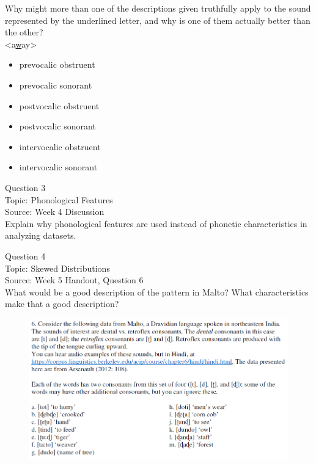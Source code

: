 \documentclass[12pt]{article}
\begin{document}
Why might more than one of the descriptions given truthfully apply to the sound represented by the underlined letter, and why is one of them actually better than the other?\\

<a\underline{w}ay>

\begin{itemize} \item prevocalic obstruent \item prevocalic sonorant \item postvocalic obstruent \item postvocalic sonorant \item intervocalic obstruent \item intervocalic sonorant \end{itemize}


\newpage

{\large Question 3}\\

Topic: Phonological Features\\
Source: Week 4 Discussion\\

Explain why phonological features are used instead of phonetic characteristics in analyzing datasets.\\


\newpage

{\large Question 4}\\

Topic: Skewed Distributions\\
Source: Week 5 Handout, Question 6\\

What would be a good description of the pattern in Malto? What characteristics make that a good description?\\

\begin{figure}[H]
\includegraphics{../images/malto.png}
\end{figure}
\end{document}
